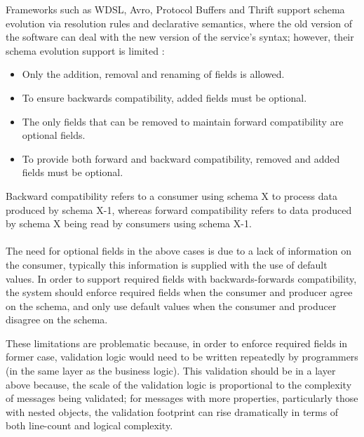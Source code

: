 Frameworks such as WDSL, Avro, Protocol Buffers and Thrift support schema evolution via resolution rules and declarative semantics,
where the old version of the software can deal with the new version of the service’s syntax; however, their schema evolution support is limited \cite{11}:
\begin{itemize}
    \item Only the addition, removal and renaming of fields is allowed.
    \item To ensure backwards compatibility, added fields must be optional.
    \item The only fields that can be removed to maintain forward compatibility are optional fields.
    \item To provide both forward and backward compatibility, removed and added fields must be optional.
\end{itemize}
Backward compatibility refers to a consumer using schema X to process data produced by schema X-1,
whereas forward compatibility refers to data produced by schema X being read by consumers using schema X-1.

\paragraph{}

The need for optional fields in the above cases is due to a lack of information on the consumer, typically this information is supplied with the use of default values.
In order to support required fields with backwards-forwards compatibility, the system should enforce required fields when the consumer and producer agree on the schema,
and only use default values when the consumer and producer disagree on the schema.

These limitations are problematic because, in order to enforce required fields in former case,
validation logic would need to be written repeatedly by programmers (in the same layer as the business logic).
This validation should be in a layer above because, the scale of the validation logic is proportional to the complexity of messages being validated;
for messages with more properties, particularly those with nested objects, the validation footprint can rise dramatically in terms of both line-count and logical complexity.

\paragraph{}

